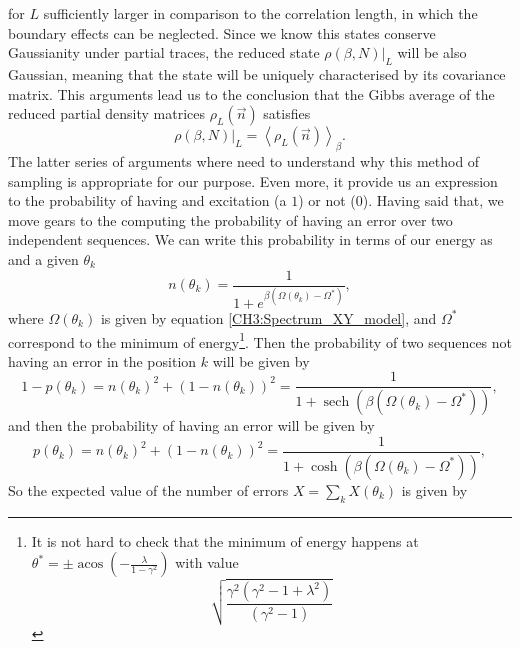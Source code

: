  for $L$ sufficiently larger in comparison to the correlation length, in which the boundary effects can be neglected. Since we know this states conserve Gaussianity under partial traces, the reduced state $\left.\rho(\beta, N)\right|_{L}$ will be also Gaussian, meaning that the state will be uniquely characterised by its covariance matrix. This arguments lead us to the conclusion that the Gibbs average of the reduced partial density matrices $\rho_L(\vec{n})$ satisfies
 \begin{equation}
 \left.\rho(\beta, N)\right|_{L}=\left\langle\rho_{L}(\vec{n})\right\rangle_{\beta}.
 \end{equation}
The latter series of arguments where need to understand why this method of sampling is appropriate for our purpose. Even more, it provide us an expression to the probability of having and excitation (a $1$) or not ($0$). Having said that, we move gears to the computing the probability of having an error over two independent sequences. We can write this probability in terms of our energy as and a given $\theta_k$
\begin{equation}
n(\theta_k)=\frac{1}{1+e^{\beta(\Omega(\theta_k)-\Omega^*)}},
\end{equation}
where $\Omega(\theta_k)$ is given by equation \eqref{CH3:Spectrum_XY_model}, and $\Omega^*$ correspond to the minimum of energy\footnote{It is not hard to check that the minimum of energy happens at $\theta^*=\pm \operatorname{acos}\left(-\frac{\lambda}{1-\gamma^2}\right)$ with value
\[\sqrt{\frac{\gamma^2(\gamma^2-1+\lambda^2)}{(\gamma^2-1)}}\]}. Then the probability of two sequences not having an error in the position $k$ will be given by
\begin{equation}
1-p(\theta_k) = n(\theta_k)^2 + (1-n(\theta_k))^2 = \frac{1}{1+\operatorname{sech}\left(\beta(\Omega(\theta_k)-\Omega^*)\right)},
\end{equation}
and then the probability of having an error will be given by
\begin{equation}
p(\theta_k) = n(\theta_k)^2 + (1-n(\theta_k))^2 = \frac{1}{1+\cosh\left(\beta(\Omega(\theta_k)-\Omega^*)\right)},
\end{equation}
So the expected value of the number of errors $X=\sum_{k}X(\theta_k)$ is given by

